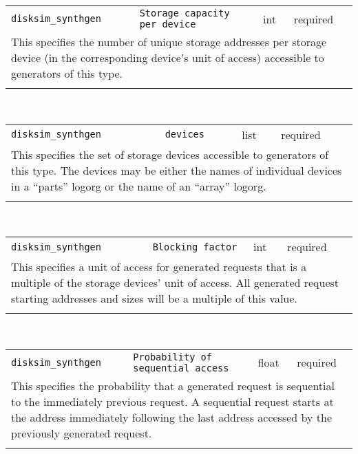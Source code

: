\noindent 
\begin{tabular}{|p{1.5in}|p{3.5in}|p{0.5in}|p{0.5in}|}
\cline{1-4}
\texttt{disksim\_synthgen} & \texttt{Storage capacity per device} & int & required \\ 
\cline{1-4}
\multicolumn{4}{|p{6in}|}{
This specifies the number of unique storage addresses per storage device
(in the corresponding device's unit of access) accessible to
generators of this type.
}\\ 
\cline{1-4}
\multicolumn{4}{p{5in}}{}\\
\end{tabular}\\ 
\noindent 
\begin{tabular}{|p{1.5in}|p{3.5in}|p{0.5in}|p{0.5in}|}
\cline{1-4}
\texttt{disksim\_synthgen} & \texttt{devices} & list & required \\ 
\cline{1-4}
\multicolumn{4}{|p{6in}|}{
This specifies the set of storage devices accessible to generators of
this type. The devices may be either the names of individual devices
in a ``parts'' logorg or the name of an ``array'' logorg.
}\\ 
\cline{1-4}
\multicolumn{4}{p{5in}}{}\\
\end{tabular}\\ 
\noindent 
\begin{tabular}{|p{1.5in}|p{3.5in}|p{0.5in}|p{0.5in}|}
\cline{1-4}
\texttt{disksim\_synthgen} & \texttt{Blocking factor} & int & required \\ 
\cline{1-4}
\multicolumn{4}{|p{6in}|}{
This specifies a unit of access for generated requests that is a multiple
of the storage devices' unit of access. All generated request
starting addresses and sizes will be a multiple of this value.
}\\ 
\cline{1-4}
\multicolumn{4}{p{5in}}{}\\
\end{tabular}\\ 
\noindent 
\begin{tabular}{|p{1.5in}|p{3.5in}|p{0.5in}|p{0.5in}|}
\cline{1-4}
\texttt{disksim\_synthgen} & \texttt{Probability of sequential access} & float & required \\ 
\cline{1-4}
\multicolumn{4}{|p{6in}|}{
This specifies the probability that a generated request is sequential to
the immediately previous request. A sequential request starts at the
address immediately following the last address accessed by the
previously generated request.
}\\ 
\cline{1-4}
\multicolumn{4}{p{5in}}{}\\
\end{tabular}\\ 
